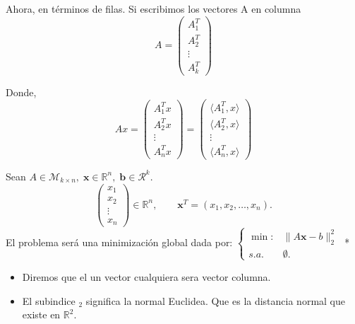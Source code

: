 \begin{paracol}{2}
\begin{notacion}
    Ahora, en términos de filas. Si escribimos los vectores A en columna
    $$
    A = 
    \begin{pmatrix}
	    A^T_1\\
	    A^T_2\\
	    \vdots\\
	    A^T_k
    \end{pmatrix}
    $$

    Donde,\\
    $$
    Ax = 
    \begin{pmatrix}
	    A^T_1x\\
	    A^T_2x\\
	    \vdots\\
	    A^T_nx
    \end{pmatrix}
    =
    \begin{pmatrix}
	    \langle A^T_1,x\rangle\\
	    \langle A^T_2,x\rangle\\
	    \vdots\\
	    \langle A^T_n,x\rangle
    \end{pmatrix}
    $$
\end{notacion}


\begin{ejem}
    Sean $A\in \mathcal{M}_{k\times n},\; \textbf{x}\in \mathbb{R}^n,\; \textbf{b}\in \mathcal{R}^k$.
    $$
    \begin{pmatrix}
	x_1\\
	x_2\\
	\vdots\\
	x_n
    \end{pmatrix}
    \in \mathbb{R}^n,
    \qquad 
    \textbf{x}^T=(x_1,x_2,\ldots,x_n).
    $$
    El problema será una minimización global dada por:\;
    $
    \left\{
    \begin{array}{rl}
	\min: &\|A\textbf{x}-b\|^2_2\\
	s.a. & \emptyset.
    \end{array}
    \right.
    $
\switchcolumn[1]*{\noindent \scriptsize
    \begin{itemize}
	\item Diremos que el un vector cualquiera sera vector columna.
	\item El subindice $_2$ significa la normal Euclidea. Que es la distancia normal que existe en $\mathbb{R}^2.$
    \end{itemize}
}


\end{ejem}
\end{paracol}
